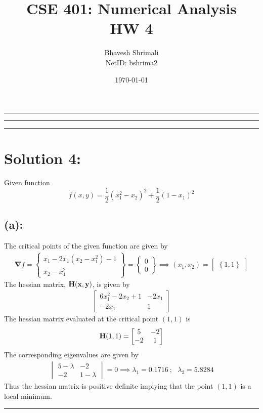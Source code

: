 
\title{\bf CSE 401: Numerical Analysis \\ HW 4}
\author{Bhavesh Shrimali \\ NetID: bshrima2}
\date{\today}
\titlespacing*{\title}{-2ex}{*-2ex}{-2ex}

\maketitle \hrule \hrule \hrule
\section*{Solution 4:}
Given function
\[
f(x,y)
=
\frac{1}{2}(x^2_1 - x_2)^2 + \frac{1}{2} (1-x_1)^2
\]
\subsection*{(a): }
The critical points of the given function are given by 
\begin{align*}
\bm\nabla f = 
\begin{Bmatrix}
x_1 - 2x_1(x_2-x^2_1) -1 \\
x_2 - x^2_1
\end{Bmatrix} = \begin{Bmatrix}
0\\0
\end{Bmatrix}\implies (x_1,x_2) = \begin{bmatrix}
\left\{
1,1
\right\}
\end{bmatrix}
\end{align*}
The hessian matrix, $\bf{H}(x,y)$, is given by
\begin{align*}
\begin{bmatrix}
6x^2_1 - 2x_2 + 1 & -2x_1\\
-2x_1 & 1
\end{bmatrix}
\end{align*}
The hessian matrix evaluated at the critical point $(1,1)$ is
\[
{\bf H} (1,1)
=
\begin{bmatrix}
5 & -2 \\
-2 & 1
\end{bmatrix}
\]
The corresponding eigenvalues are given by
\begin{align*}
\begin{vmatrix}
5-\lambda & -2 \\
-2 & 1-\lambda
\end{vmatrix} = 0 \implies \lambda_1 = 0.1716\ ; \ \ \ \lambda_2 = 5.8284
\end{align*}
Thus the hessian matrix is positive definite implying that the point $(1,1)$ is a local minimum. \\ \hrule
